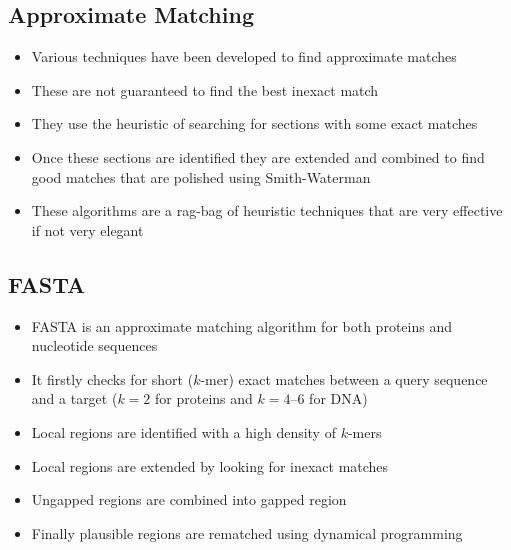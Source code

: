 
\begin{slide}
\section{Approximate Matching}

\begin{PauseHighLight}
  \begin{itemize}
  \item Various techniques have been developed to find approximate
    matches\pause
  \item These are not guaranteed to find the best inexact match\pause
  \item They use the heuristic of searching for sections with some exact
    matches\pause
  \item Once these sections are identified they are extended and
    combined to find good matches that are polished using Smith-Waterman\pause
  \item These algorithms are a rag-bag of heuristic techniques that are
    very effective if not very elegant\pause
  \end{itemize}
\end{PauseHighLight}

\end{slide}


\begin{slide}
\section[-2]{FASTA}

\begin{PauseHighLight}
  \begin{itemize}
  \item FASTA is an approximate matching algorithm for both proteins and
    nucleotide sequences\pause
  \item It firstly checks for short ($k$-mer) exact matches between a query sequence and
    a target\pause{} ($k =2$ for proteins and $k=4$--$6$ for DNA)\pause
  \item Local regions are identified with a high density of $k$-mers\pause
  \item Local regions are extended by looking for inexact matches\pause
  \item Ungapped regions are combined into gapped region\pause
  \item Finally plausible regions are rematched using dynamical programming\pause
  \end{itemize}
\end{PauseHighLight}

\end{slide}


